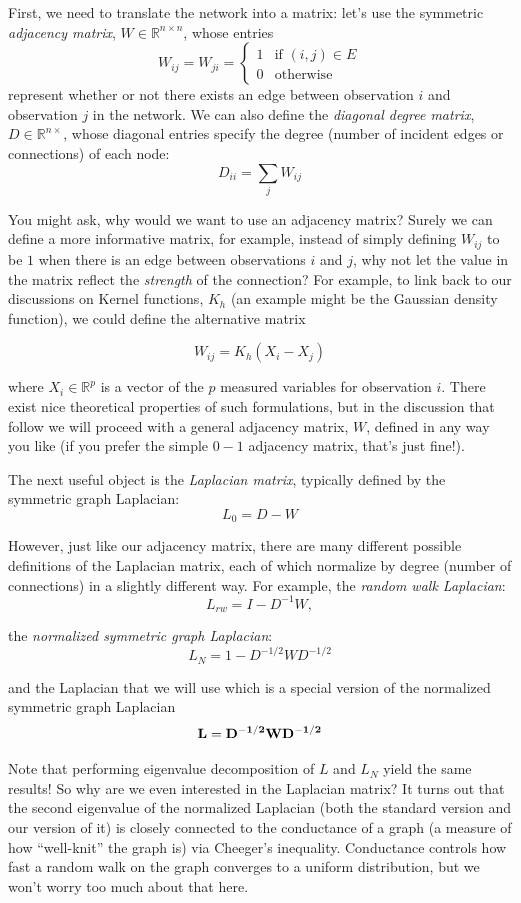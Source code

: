 First, we need to translate the network into a matrix: let's use the symmetric \emph{adjacency matrix}, $W \in \mathbb{R}^{n \times n}$, whose entries 
$$W_{ij} = W_{ji} = \begin{cases} 1 & \text{if } (i, j) \in E \\ 0 & \text{otherwise} \end{cases}$$ 
represent whether or not there exists an edge between observation $i$ and observation $j$ in the network. We can also define the \emph{diagonal degree matrix}, $ D \in \mathbb{R}^{n \times }$, whose diagonal entries specify the degree (number of incident edges or connections) of each node:
$$D_{ii} = \sum_j W_{ij}$$


You might ask, why would we want to use an adjacency matrix? Surely we can define a more informative matrix, for example, instead of simply defining $W_{ij}$ to be $1$ when there is an edge between observations $i$ and $j$, why not let the value in the matrix reflect the \emph{strength} of the connection? For example, to link back to our discussions on Kernel functions, $K_h$ (an example might be the Gaussian density function), we could define the alternative matrix

$$W_{ij} = K_h(X_i - X_j)$$

where $X_i \in \mathbb{R}^p$ is a vector of the $p$ measured variables for observation $i$. There exist nice theoretical properties of such formulations, but in the discussion that follow we will proceed with a general adjacency matrix, $W$, defined in any way you like (if you prefer the simple $0-1$ adjacency matrix, that's just fine!). 

The next useful object is the \emph{Laplacian matrix}, typically defined by the symmetric graph Laplacian:
$$L_0 = D - W$$

However, just like our adjacency matrix, there are many different possible definitions of the Laplacian matrix, each of which normalize by degree (number of connections) in a slightly different way. For example, the \emph{random walk Laplacian}:
$$L_{rw} = I - D^{-1}W,$$

the \emph{normalized symmetric graph Laplacian}:
$$L_N = 1 - D^{-1/2}WD^{-1/2}$$

and the Laplacian that we will use which is a special version of the normalized symmetric graph Laplacian
$${\bf L = D^{-1/2}WD^{-1/2}}$$

Note that performing eigenvalue decomposition of $L$ and $L_N$ yield the same results! So why are we even interested in the Laplacian matrix? It turns out that the second eigenvalue of the normalized Laplacian (both the standard version and our version of it) is closely connected to the conductance of a graph (a measure of how ``well-knit'' the graph is) via Cheeger's inequality. Conductance controls how fast a random walk on the graph converges to a uniform distribution, but we won't worry too much about that here.

